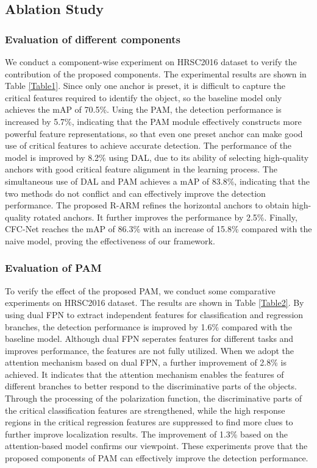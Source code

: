 \documentclass[journal]{IEEEtran}
\begin{document}
\subsection{Ablation Study}

\subsubsection{Evaluation of different components}
We conduct a component-wise experiment on HRSC2016 dataset to verify the contribution of the proposed components. The experimental results are shown in Table \ref{Table1}. Since only one anchor is preset, it is difficult to capture the critical features required to identify the object, so the baseline model only achieves the mAP of 70.5\%. Using the PAM, the detection performance is increased by 5.7\%, indicating that the PAM module effectively constructs more powerful feature representations, so that even one preset anchor can make good use of critical features to achieve accurate detection. The performance of the model is improved by 8.2\% using DAL, due to its ability of selecting high-quality anchors with good critical feature alignment in the learning process. The simultaneous use of DAL and PAM achieves a mAP of 83.8\%, indicating that the two methods do not conflict and can effectively improve the detection performance. The proposed  R-ARM refines the horizontal anchors to obtain high-quality rotated anchors. It further improves the performance by 2.5\%. Finally, CFC-Net reaches the mAP of 86.3\% with an increase of 15.8\% compared with the naive model, proving the effectiveness of our framework.





\subsubsection{Evaluation of PAM}

To verify the effect of the proposed PAM, we conduct some comparative experiments on HRSC2016 dataset. The results are shown in Table \ref{Table2}. By using dual FPN to extract independent features for classification and regression branches, the detection performance is improved by 1.6\% compared with the baseline model. Although dual FPN seperates features for different tasks and  improves performance, the features are not fully utilized. When we adopt the attention mechanism based on dual FPN, a further improvement of 2.8\%  is achieved. It indicates that the attention mechanism enables the features of different branches to better respond to the discriminative parts of the objects. Through the processing of the polarization function, the discriminative parts of the critical classification features are strengthened, while the high response regions in the critical regression features are suppressed to find more clues to further improve localization results. The improvement of 1.3\% based on the attention-based model confirms our viewpoint. These experiments prove that the proposed components of PAM can effectively improve the detection performance. 
\end{document}
